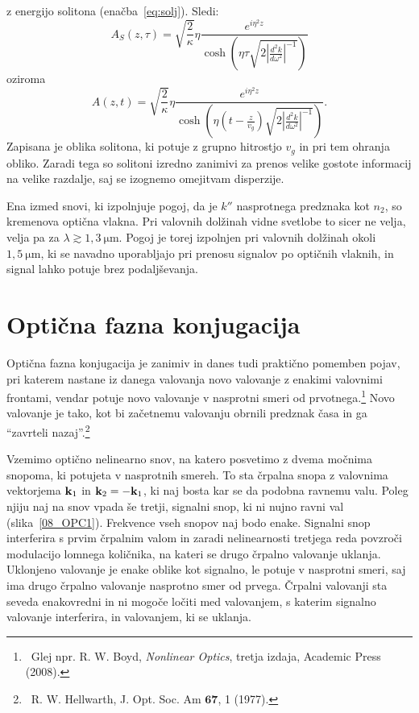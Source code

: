 z energijo solitona (enačba~\ref{eq:solj}). Sledi:
\begin{equation}
A_S\left(z,\tau\right)=\sqrt{\frac{2}{\kappa}}\eta\frac{e^{i\eta^{2}z}}{{\cosh}\left(\eta \tau 
\sqrt{2\left|\frac{d^{2}k}{d\omega^{2}}\right|^{-1}}\right)}
\end{equation}
oziroma
\begin{equation}
A\left(z,t\right)=\sqrt{\frac{2}{\kappa}}\eta\frac{e^{i\eta^{2}z}}{{\cosh}\left(\eta (t-\frac{z}{v_g}) 
\sqrt{2\left|\frac{d^{2}k}{d\omega^{2}}\right|^{-1}}\right)}.
\label{8.96}
\end{equation}
Zapisana je oblika solitona, ki potuje z grupno hitrostjo $v_g$ in pri tem ohranja obliko. Zaradi tega
so solitoni izredno zanimivi za prenos velike gostote informacij na velike razdalje, saj se izognemo
omejitvam disperzije. 

\begin{remark}
Ena izmed snovi, ki izpolnjuje pogoj, da je $k''$ nasprotnega predznaka kot $n_2$, so kremenova 
optična vlakna. Pri valovnih dolžinah vidne svetlobe to sicer ne velja, velja pa za 
$\lambda \gtrsim 1,3~\si{\micro\metre}$.
Pogoj je torej izpolnjen pri valovnih dolžinah okoli $1,5~\si{\micro\metre}$, ki se navadno uporabljajo 
pri prenosu signalov po optičnih vlaknih, in signal lahko potuje brez podaljševanja. 
\end{remark}

\section{Optična fazna konjugacija}
Optična fazna konjugacija je zanimiv in danes tudi praktično pomemben
pojav, pri katerem nastane iz danega valovanja novo valovanje z enakimi valovnimi
frontami, vendar potuje novo valovanje v nasprotni smeri od prvotnega.\footnote{~Glej npr. R.
W. Boyd, {\it Nonlinear Optics}, tretja izdaja, Academic Press (2008).} Novo valovanje je tako,
kot bi začetnemu valovanju obrnili predznak časa in ga ``zavrteli nazaj''.\footnote{~R. W. Hellwarth, 
J. Opt. Soc. Am $\mathbf{67}$, 1 (1977).}

Vzemimo optično nelinearno snov, na katero posvetimo z dvema močnima 
snopoma, ki potujeta v nasprotnih smereh. To sta črpalna snopa z valovnima vektorjema
${\bf k}_{1}$ in ${\bf k}_2 = -{\bf k}_{1}$, ki naj bosta kar se da podobna ravnemu valu. 
Poleg njiju naj na snov vpada
še tretji, signalni snop, ki ni nujno ravni val (slika~\ref{08_OPC1}). 
Frekvence vseh snopov naj bodo enake.
Signalni snop interferira s prvim črpalnim valom in zaradi nelinearnosti 
tretjega reda povzroči modulacijo lomnega količnika, na kateri se
drugo črpalno valovanje uklanja. Uklonjeno valovanje je enake oblike
kot signalno, le potuje v nasprotni smeri, saj ima drugo črpalno valovanje
nasprotno smer od prvega. Črpalni valovanji sta seveda enakovredni in ni
mogoče ločiti med valovanjem, s katerim signalno valovanje interferira, in valovanjem, 
ki se uklanja.

